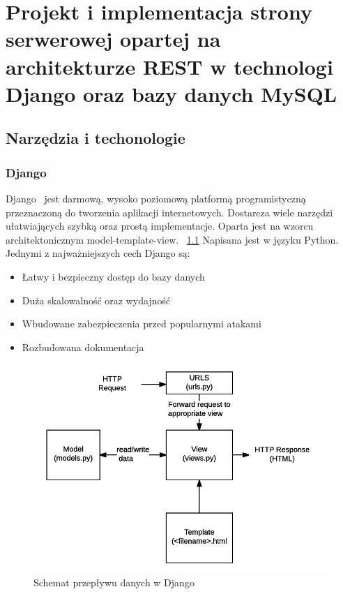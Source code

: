 
\chapter{Projekt i implementacja strony serwerowej opartej na architekturze REST w technologi Django oraz bazy danych MySQL}
\section{Narzędzia i techonologie}
\subsection{Django}
Django~\cite{Django} jest darmową, wysoko poziomową platformą programistyczną przeznaczoną do tworzenia aplikacji internetowych. Dostarcza wiele narzędzi ułatwiających szybką oraz prostą implementacje. Oparta jest na wzorcu architektonicznym model-template-view. ~\ref{rys:django} Napisana jest w języku Python. Jednymi z najważniejszych cech Django są:
\begin{itemize}
	\item Łatwy i bezpieczny dostęp do bazy danych
	\item Duża skalowalność oraz wydajność
	\item Wbudowane zabezpieczenia przed popularnymi atakami
	\item Rozbudowana dokumentacja
\end{itemize}
\begin{figure}[H]
	\centering\includegraphics[width=\textwidth]{figures/DjangoSchemat}
	\caption{Schemat przepływu danych w Django~\cite{DjangoSchemat}}\label{rys:django}
\end{figure}
